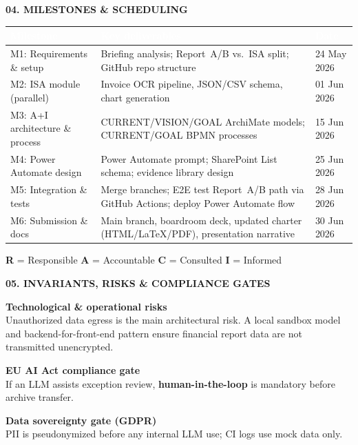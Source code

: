 \documentclass[11pt,a4paper]{article}
\newcommand{\sectiontitle}[1]{%
  \vspace{1.2em}%
  {\color{ISAAIBlue}\bfseries\MakeUppercase{#1}}%
  \vspace{0.4em}\par
}
\newcommand{\metatag}[1]{%
  \tcbox[
    on line,
    arc=2pt,
    boxrule=0.4pt,
    colback=gray!10,
    colframe=ISAAIBorder,
    left=3pt,right=3pt,top=1pt,bottom=1pt
  ]{\scriptsize\bfseries #1}%
}
\begin{document}
\sectiontitle{04. Milestones \& scheduling}

\begin{longtable}{@{}p{}p{}p{}@{}}
\toprule
\rowcolor{ISAAIBlue}
\textcolor{white}{\textbf{Milestone}} & \textcolor{white}{\textbf{Key deliverables}} & \textcolor{white}{\textbf{Date}} \\
\midrule
\endhead
M1: Requirements \& setup &
Briefing analysis; Report~A/B vs.\ ISA split; GitHub repo structure &
24 May 2026 \metatag{\color{ISAAIGreen}done} \\
M2: ISA module (parallel) &
Invoice OCR pipeline, JSON/CSV schema, chart generation &
01 Jun 2026 \metatag{\color{ISAAIGreen}done} \\
M3: A+I architecture \& process &
CURRENT/VISION/GOAL ArchiMate models; CURRENT/GOAL BPMN processes &
15 Jun 2026 \metatag{\color{ISAAIGreen}done} \\
M4: Power Automate design &
Power Automate prompt; SharePoint List schema; evidence library design &
25 Jun 2026 \metatag{\color{ISAAIGreen}done} \\
M5: Integration \& tests &
Merge branches; E2E test Report~A/B path via GitHub Actions; deploy Power Automate flow &
28 Jun 2026 \\
M6: Submission \& docs &
Main branch, boardroom deck, updated charter (HTML/LaTeX/PDF), presentation narrative &
30 Jun 2026 \\
\bottomrule
\end{longtable}



\normalsize
\textbf{R} = Responsible \quad \textbf{A} = Accountable \quad \textbf{C} = Consulted \quad \textbf{I} = Informed

\newpage


\sectiontitle{05. Invariants, risks \& compliance gates}

\begin{tcolorbox}[colback=ISAAIWarnBg, colframe=yellow!50!black, arc=2pt]
\textbf{\color{ISAAIWarnText}Technological \& operational risks}\\
Unauthorized data egress is the main architectural risk. A local sandbox model and backend-for-front-end pattern ensure financial report data are not transmitted unencrypted.
\end{tcolorbox}

\vspace{0.5em}
\begin{minipage}[t]{0.48\textwidth}
\textbf{\color{ISAAIBlue}EU AI Act compliance gate}\\
If an LLM assists exception review, \textbf{human-in-the-loop} is mandatory before archive transfer.
\end{minipage}\hfill
\begin{minipage}[t]{0.48\textwidth}
\textbf{\color{ISAAIBlue}Data sovereignty gate (GDPR)}\\
PII is pseudonymized before any internal LLM use; CI logs use mock data only.
\end{minipage}
\end{document}
